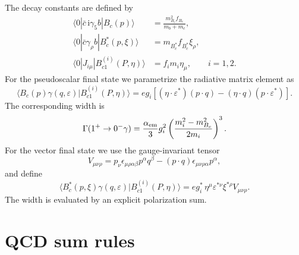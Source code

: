 \documentclass[aps,prd,preprint,nofootinbib,superscriptaddress]{revtex4-2}
\newcommand{\ii}{\mathrm{i}}
\newcommand{\Bc}{B_c}
\newcommand{\Bcst}{B_c^\ast}
\newcommand{\Bcone}{B_{c1}}
\begin{document}
The decay constants are defined by
\begin{align}
  \langle 0|\bar c\,\ii\gamma_5 b|\Bc(p)\rangle
  &= \frac{m_{\Bc}^2 f_{\Bc}}{m_b+m_c},\\
  \langle 0|\bar c\gamma_\rho b|\Bcst(p,\xi)\rangle
  &= m_{\Bcst}f_{\Bcst}\xi_\rho,\\
  \langle0|J_{i\mu}|\Bcone^{(i)}(P,\eta)\rangle
  &= f_i m_i \eta_\mu,\qquad i=1,2 .
  \label{eq:decay-constants}
\end{align}
For the pseudoscalar final state we parametrize the radiative matrix element as
\begin{equation}
  \langle \Bc(p)\gamma(q,\varepsilon)|\Bcone^{(i)}(P,\eta)\rangle
  =
  e g_i
  \left[
  (\eta\cdot\varepsilon^*)(p\cdot q)
  -(\eta\cdot q)(p\cdot\varepsilon^*)
  \right].
  \label{eq:ps-matrix}
\end{equation}
The corresponding width is
\begin{equation}
  \Gamma(1^+\to0^-\gamma)
  =
  \frac{\alpha_{\rm em}}{3}g_i^2
  \left(\frac{m_i^2-m_{\Bc}^2}{2m_i}\right)^3 .
  \label{eq:ps-width}
\end{equation}
For the vector final state we use the gauge-invariant tensor
\begin{equation}
  V_{\mu\nu\rho}
  =
  p_\nu\epsilon_{\mu\rho\alpha\beta}p^\alpha q^\beta
  -(p\cdot q)\epsilon_{\mu\nu\rho\alpha}p^\alpha ,
  \label{eq:v-tensor}
\end{equation}
and define
\begin{equation}
  \langle \Bcst(p,\xi)\gamma(q,\varepsilon)|\Bcone^{(i)}(P,\eta)\rangle
  =
  e g_i^\ast\,\eta^\mu\varepsilon^{\ast\nu}\xi^{\ast\rho}V_{\mu\nu\rho}.
  \label{eq:vec-matrix}
\end{equation}
The width is evaluated by an explicit polarization sum.

\section{QCD sum rules}
\label{sec:qcdsr}
\end{document}
